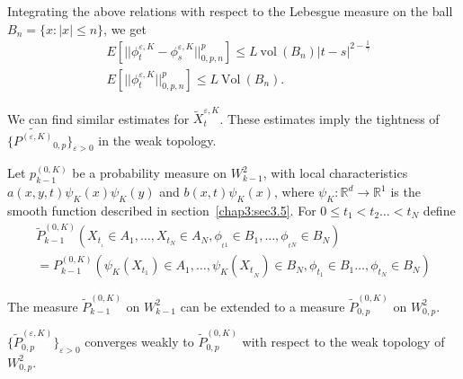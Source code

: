 Integrating the above relations with respect to the Lebesgue measure
on the ball $B_n = \{ x:  |x| \le n\}$, we get 
\begin{align*}
  & E \left[|| \phi^{\varepsilon,K}_t - \phi^{\varepsilon,K}_s ||
    ^p_{0,p,n}\right] \le L ~\text{vol}~ (B_n) |t-s| ^{2 -\frac{1}{\gamma}}\\ 
  & E \left[|| \phi^{\varepsilon,K}_t || ^p_{0,p,n}\right] \le L ~\text{Vol}~ (B_n).
\end{align*}

We can find similar estimates for $\tilde{X}^{\varepsilon,K}_t$. These
estimates imply the tightness of $\{ \tilde{P^{(\varepsilon,K)}} _{0,p}\}
_{\varepsilon > 0}$ in the weak topology. 

Let $p^{(0,K)}_{k-1}$ be a probability measure on $W^2_{k-1}$, with
local characteristics $a (x,y,t) \psi_K (x) \psi_K (y)$ and $b
(x,t)\psi_K (x)$, where $\psi_K: \mathbb{R}^d \to \mathbb{R}^1$ is the
smooth function described in section~\ref{chap3:sec3.5}. For $0 \le t_1 < t_2 \dots
< t_N$ define 
\begin{multline*}
  \tilde{P}^{(0,K)}_{k-1} (X_{t_{_1}} \in A_1, \ldots, X_{t_{N}}
  \in A_N, \phi_{_t{_1}}  \in   B_1,\ldots,
  \phi_{_t{_N}}  \in  B_N)\\ 
  = P^{(0,K)}_{k-1} (\psi_K (X_{t_1}) \in A_1, \ldots,
  \psi_K (X{_t}_{_N}) \in B_N, \phi_{t{_1}} \in B_1
  \ldots, \phi_{t{_N}} \in B_N ) 
\end{multline*}\pageoriginale

The measure $\tilde{P}^{(0,K)}_{k-1}$ on $W^2_{k-1}$ can be extended
to a measure $\tilde{P}^{(0,K)}_{0,p}$ on $W^2_{0,p}$. 



\begin{Lemma}\label{c3:lem3.6.2} %
  $\{\tilde{P}^{(\varepsilon,K)}_{0, p}\}_{\varepsilon > 0}$ converges
  weakly to $\tilde{P}^{(0,K)}_{0, p}$ with respect to the weak
  topology of $W^2_{0, p}$. 
\end{Lemma}

